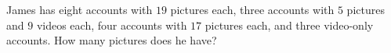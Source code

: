 James has eight accounts with $19$ pictures each, three accounts with $5$ pictures and $9$ videos each, four accounts with $17$ pictures each, and three video-only accounts. How many pictures does he have?
